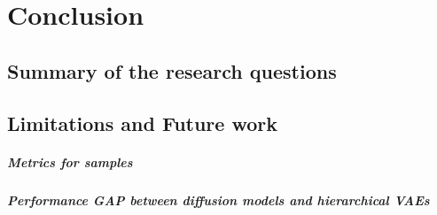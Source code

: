 \chapter{Conclusion}

\section{Summary of the research questions}




\section{Limitations and Future work}

\paragraph{Metrics for samples}

\paragraph{Performance GAP between diffusion models and hierarchical VAEs}

